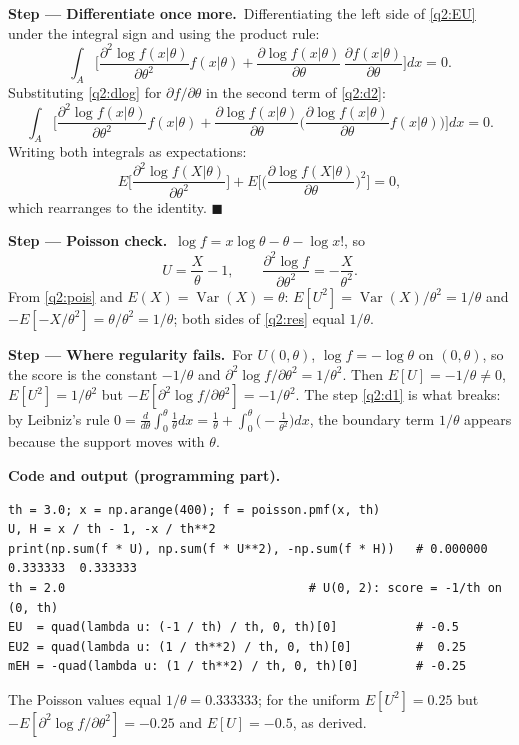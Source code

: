 \documentclass[11pt,a4paper]{article}
\numberwithin{equation}{questao}   %
\newcommand{\passo}[2]{\par\smallskip\noindent\textbf{Step --- #1.}~#2}
\newcommand{\codehead}{\par\smallskip\noindent\textbf{Code and output (programming part).}\par}
\newcommand{\Var}{\operatorname{Var}}
\newcommand{\1}{\mathbf{1}}
\begin{document}
\begin{sol}
\passo{Differentiate once more}{Differentiating the left side of \eqref{q2:EU} under the integral
sign and using the product rule:}
\begin{equation}\label{q2:d2}
\int_A\Big[\frac{\partial^2\log f(x|\theta)}{\partial\theta^2}f(x|\theta)
+\frac{\partial\log f(x|\theta)}{\partial\theta}\,\frac{\partial f(x|\theta)}{\partial\theta}\Big]dx=0 .
\end{equation}
Substituting \eqref{q2:dlog} for $\partial f/\partial\theta$ in the second term of \eqref{q2:d2}:
\[
\int_A\Big[\frac{\partial^2\log f(x|\theta)}{\partial\theta^2}f(x|\theta)
+\frac{\partial\log f(x|\theta)}{\partial\theta}\Big(\frac{\partial\log f(x|\theta)}{\partial\theta}f(x|\theta)\Big)\Big]dx=0 .
\]
Writing both integrals as expectations:
\begin{equation}\label{q2:res}
E\Big[\frac{\partial^2\log f(X|\theta)}{\partial\theta^2}\Big]+E\Big[\Big(\frac{\partial\log f(X|\theta)}{\partial\theta}\Big)^2\Big]=0,
\end{equation}
which rearranges to the identity. $\blacksquare$

\passo{Poisson check}{$\log f=x\log\theta-\theta-\log x!$, so}
\begin{equation}\label{q2:pois}
U=\frac{X}{\theta}-1,\qquad \frac{\partial^2\log f}{\partial\theta^2}=-\frac{X}{\theta^2}.
\end{equation}
From \eqref{q2:pois} and $E(X)=\Var(X)=\theta$: $E[U^2]=\Var(X)/\theta^2=1/\theta$ and
$-E[-X/\theta^2]=\theta/\theta^2=1/\theta$; both sides of \eqref{q2:res} equal $1/\theta$.

\passo{Where regularity fails}{For $U(0,\theta)$, $\log f=-\log\theta$ on $(0,\theta)$, so the
score is the constant $-1/\theta$ and $\partial^2\log f/\partial\theta^2=1/\theta^2$. Then
$E[U]=-1/\theta\neq0$, $E[U^2]=1/\theta^2$ but $-E[\partial^2\log f/\partial\theta^2]=-1/\theta^2$.
The step \eqref{q2:d1} is what breaks: by Leibniz's rule
$0=\frac{d}{d\theta}\int_0^\theta\frac1\theta dx=\frac1\theta+\int_0^\theta\big(-\frac{1}{\theta^2}\big)dx$,
the boundary term $1/\theta$ appears because the support moves with $\theta$.}

\codehead
{\small
\begin{verbatim}
th = 3.0; x = np.arange(400); f = poisson.pmf(x, th)
U, H = x / th - 1, -x / th**2
print(np.sum(f * U), np.sum(f * U**2), -np.sum(f * H))   # 0.000000  0.333333  0.333333
th = 2.0                                  # U(0, 2): score = -1/th on (0, th)
EU  = quad(lambda u: (-1 / th) / th, 0, th)[0]           # -0.5
EU2 = quad(lambda u: (1 / th**2) / th, 0, th)[0]         #  0.25
mEH = -quad(lambda u: (1 / th**2) / th, 0, th)[0]        # -0.25
\end{verbatim}
}
The Poisson values equal $1/\theta=0.333333$; for the uniform $E[U^2]=0.25$ but
$-E[\partial^2\log f/\partial\theta^2]=-0.25$ and $E[U]=-0.5$, as derived.


\end{sol}
\end{document}
